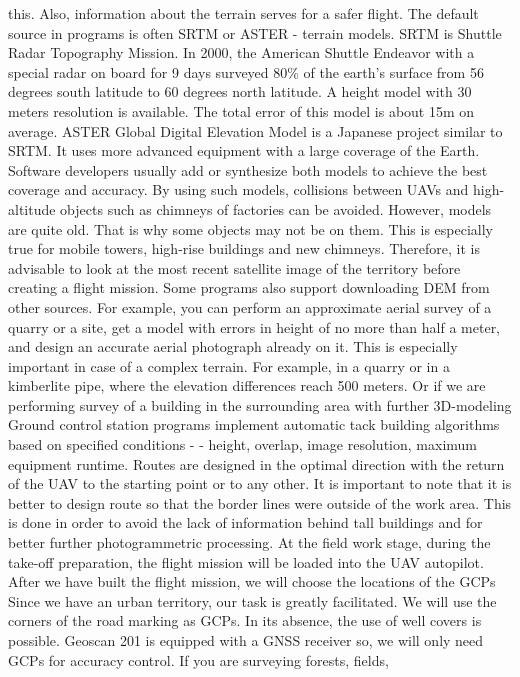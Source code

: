 \documentclass[
  letterpaper,
  DIV=11,
  numbers=noendperiod]{scrreprt}
\begin{document}
this. Also, information about the terrain serves for a safer flight. The
default source in programs is often SRTM or ASTER - terrain models. SRTM
is Shuttle Radar Topography Mission. In 2000, the American Shuttle
Endeavor with a special radar on board for 9 days surveyed 80\% of the
earth's surface from 56 degrees south latitude to 60 degrees north
latitude. A height model with 30 meters resolution is available. The
total error of this model is about 15m on average. ASTER Global Digital
Elevation Model is a Japanese project similar to SRTM. It uses more
advanced equipment with a large coverage of the Earth. Software
developers usually add or synthesize both models to achieve the best
coverage and accuracy. By using such models, collisions between UAVs and
high-altitude objects such as chimneys of factories can be avoided.
However, models are quite old. That is why some objects may not be on
them. This is especially true for mobile towers, high-rise buildings and
new chimneys. Therefore, it is advisable to look at the most recent
satellite image of the territory before creating a flight mission. Some
programs also support downloading DEM from other sources. For example,
you can perform an approximate aerial survey of a quarry or a site, get
a model with errors in height of no more than half a meter, and design
an accurate aerial photograph already on it. This is especially
important in case of a complex terrain. For example, in a quarry or in a
kimberlite pipe, where the elevation differences reach 500 meters. Or if
we are performing survey of a building in the surrounding area with
further 3D-modeling Ground control station programs implement automatic
tack building algorithms based on specified conditions - - height,
overlap, image resolution, maximum equipment runtime. Routes are
designed in the optimal direction with the return of the UAV to the
starting point or to any other. It is important to note that it is
better to design route so that the border lines were outside of the work
area. This is done in order to avoid the lack of information behind tall
buildings and for better further photogrammetric processing. At the
field work stage, during the take-off preparation, the flight mission
will be loaded into the UAV autopilot. After we have built the flight
mission, we will choose the locations of the GCPs Since we have an urban
territory, our task is greatly facilitated. We will use the corners of
the road marking as GCPs. In its absence, the use of well covers is
possible. Geoscan 201 is equipped with a GNSS receiver so, we will only
need GCPs for accuracy control. If you are surveying forests, fields,
\end{document}
